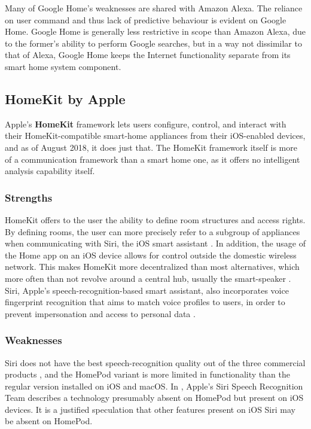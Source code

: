 \documentclass[letterpaper, twocolumn, 10pt, conference]{IEEEtran}
\newcommand{\term}[1]{\textbf{#1}}
\begin{document}
Many of Google Home's weaknesses are shared with Amazon Alexa. The reliance on user command and thus lack of predictive behaviour is evident on Google Home. Google Home is generally less restrictive in scope than Amazon Alexa, due to the former's ability to perform Google searches, but in a way not dissimilar to that of Alexa, Google Home keeps the Internet functionality separate from its smart home system component.

\subsection{HomeKit by Apple} \label{ssec:homekit}

Apple's \term{HomeKit} framework lets users configure, control, and interact with their HomeKit-compatible smart-home appliances from their iOS-enabled devices, and as of August 2018, it does just that. The HomeKit framework itself is more of a communication framework than a smart home one, as it offers no intelligent analysis capability itself.

\subsubsection*{Strengths} \label{sssec:homekit_strengths}

HomeKit offers to the user the ability to define room structures and access rights. By defining rooms, the user can more precisely refer to a subgroup of appliances when communicating with Siri, the iOS smart assistant \cite{ritchie2014homekit, wollerton2015control}. In addition, the usage of the Home app on an iOS device allows for control outside the domestic wireless network. This makes HomeKit more decentralized than most alternatives, which more often than not revolve around a central hub, usually the smart-speaker \cite{crist2018what}. Siri, Apple's speech-recognition-based smart assistant, also incorporates voice fingerprint recognition that aims to match voice profiles to users, in order to prevent impersonation and access to personal data \cite{siri2018personalized}.

\subsubsection*{Weaknesses} \label{sssec:homekit_weaknesses}

Siri does not have the best speech-recognition quality out of the three commercial products \cite{wollerton2018siri}, and the HomePod variant is more limited in functionality than the regular version installed on iOS and macOS. In \cite{siri2018finding}, Apple's Siri Speech Recognition Team describes a technology presumably absent on HomePod but present on iOS devices. It is a justified speculation that other features present on iOS Siri may be absent on HomePod.
\end{document}
